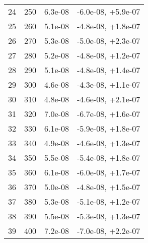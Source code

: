 \begin{table}
\begin{adjustbox}{width=1\textwidth/2}
\begin{tabular}{|c|c|c|c|}
\cline{1-4}
24 & 250 & 6.3e-08 & -6.0e-08, +5.9e-07 \\
\cline{1-4}
25 & 260 & 5.1e-08 & -4.8e-08, +1.8e-07 \\
\cline{1-4}
26 & 270 & 5.3e-08 & -5.0e-08, +2.3e-07 \\
\cline{1-4}
27 & 280 & 5.2e-08 & -4.8e-08, +1.2e-07 \\
\cline{1-4}
28 & 290 & 5.1e-08 & -4.8e-08, +1.4e-07 \\
\cline{1-4}
29 & 300 & 4.6e-08 & -4.3e-08, +1.1e-07 \\
\cline{1-4}
30 & 310 & 4.8e-08 & -4.6e-08, +2.1e-07 \\
\cline{1-4}
31 & 320 & 7.0e-08 & -6.7e-08, +1.6e-07 \\
\cline{1-4}
32 & 330 & 6.1e-08 & -5.9e-08, +1.8e-07 \\
\cline{1-4}
33 & 340 & 4.9e-08 & -4.6e-08, +1.3e-07 \\
\cline{1-4}
34 & 350 & 5.5e-08 & -5.4e-08, +1.8e-07 \\
\cline{1-4}
35 & 360 & 6.1e-08 & -6.0e-08, +1.7e-07 \\
\cline{1-4}
36 & 370 & 5.0e-08 & -4.8e-08, +1.5e-07 \\
\cline{1-4}
37 & 380 & 5.3e-08 & -5.1e-08, +1.2e-07 \\
\cline{1-4}
38 & 390 & 5.5e-08 & -5.3e-08, +1.3e-07 \\
\cline{1-4}
39 & 400 & 7.2e-08 & -7.0e-08, +2.2e-07 \\
\cline{1-4}
\end{tabular}
\end{adjustbox}
\end{table}

